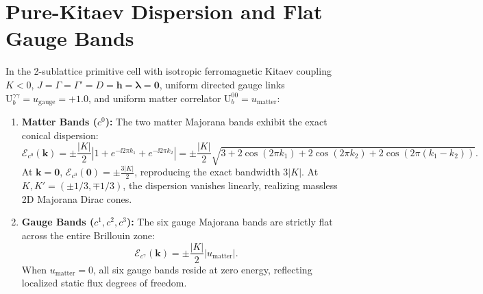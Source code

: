 \section{Pure-Kitaev Dispersion and Flat Gauge Bands}
\label{sec:m1_2_pure_kitaev_dispersion}

\begin{theorem}
\label{thm:m1_2_pure_kitaev_dispersion}
In the 2-sublattice primitive cell with isotropic ferromagnetic Kitaev coupling $K < 0$, $J = \Gamma = \Gamma' = D = \mathbf{h} = \boldsymbol{\lambda} = \mathbf{0}$, uniform directed gauge links $\mathrm{U}_b^{\gamma\gamma} = u_{\mathrm{gauge}} = +1.0$, and uniform matter correlator $\mathrm{U}_b^{00} = u_{\mathrm{matter}}$:
\begin{enumerate}
\item \textbf{Matter Bands ($c^0$):} The two matter Majorana bands exhibit the exact conical dispersion:
\begin{equation}
\label{eq:m1_2_matter_dispersion}
\mathcal{E}_{c^0}(\mathbf{k}) = \pm \frac{|K|}{2} |1 + e^{-\ii 2\pi k_1} + e^{-\ii 2\pi k_2}| = \pm \frac{|K|}{2} \sqrt{3 + 2\cos(2\pi k_1) + 2\cos(2\pi k_2) + 2\cos(2\pi(k_1 - k_2))}.
\end{equation}
At $\mathbf{k} = \mathbf{0}$, $\mathcal{E}_{c^0}(\mathbf{0}) = \pm \frac{3|K|}{2}$, reproducing the exact bandwidth $3|K|$. At $K, K' = (\pm 1/3, \mp 1/3)$, the dispersion vanishes linearly, realizing massless 2D Majorana Dirac cones.
\item \textbf{Gauge Bands ($c^1, c^2, c^3$):} The six gauge Majorana bands are strictly flat across the entire Brillouin zone:
\begin{equation}
\label{eq:m1_2_gauge_flat_bands}
\mathcal{E}_{c^\gamma}(\mathbf{k}) = \pm \frac{|K|}{2} |u_{\mathrm{matter}}|.
\end{equation}
When $u_{\mathrm{matter}} = 0$, all six gauge bands reside at zero energy, reflecting localized static flux degrees of freedom.
\end{enumerate}
\end{theorem}
